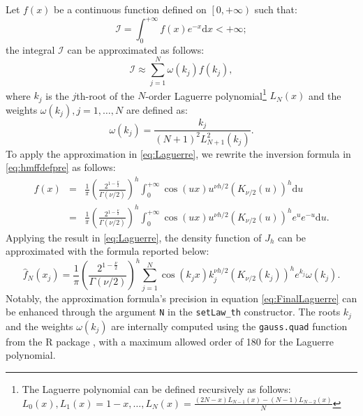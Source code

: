Let \(f\left(x\right)\) be a continuous function defined on \(\left[0, +\infty\right)\) such that:
\begin{equation*}
\mathcal{I}=\int_0^{+\infty} f\left(x\right) e^{-x}\mbox{d}x<+\infty;
\end{equation*}
the integral \(\mathcal{I}\) can be approximated as follows:
\begin{equation}
\mathcal{I}\approx \sum_{j=1}^{N}\omega\left(k_j\right)f\left(k_{j}\right),
\label{eq:Laguerre}
\end{equation}
where \(k_j\) is the \(j\)th-root of the \(N\)-order Laguerre polynomial\footnote{The Laguerre polynomial can be defined recursively as follows: \(L_0\left(x\right), L_1(x)=1-x, \ldots, L_{N}\left(x\right)=\frac{\left(2N-x\right)L_{N-1}\left(x\right)-\left(N-1\right)L_{N-2}\left(x\right)}{N}\)} \(L_N\left(x\right)\) and the weights \(\omega\left(k_j\right), j=1,\ldots, N\) are defined as:
\begin{equation}
\omega\left(k_{j}\right) = \frac{k_{j}}{\left(N+1\right)^2 L_{N+1}^2\left(k_j\right)}.
\end{equation}
To apply the approximation in \eqref{eq:Laguerre}, we rewrite the inversion formula in \eqref{eq:hmffdefpre} as follows:
\begin{eqnarray}
f\left(x\right)&=&\frac{1}{\pi}\left(\frac{2^{1-\frac{\nu}{2}}}{\Gamma\left(\nu/2\right)}\right)^h\int_{0}^{+\infty}\cos\left(ux\right)u^{\nu h/2}\left(K_{\nu/2}\left(u\right)\right)^h\mbox{d}u\nonumber\\
&=&\frac{1}{\pi}\left(\frac{2^{1-\frac{\nu}{2}}}{\Gamma\left(\nu/2\right)}\right)^h\int_{0}^{+\infty}\cos\left(ux\right)u^{\nu h/2}\left(K_{\nu/2}\left(u\right)\right)^he^{u}e^{-u}\mbox{d}u.
\label{eq:InvForLM}
\end{eqnarray}
Applying the result in \eqref{eq:Laguerre}, the density function of \(J_h\) can be approximated with the formula reported below:
\begin{equation}
\hat{f}_{N}\left(x_j\right) = \frac{1}{\pi}\left(\frac{2^{1-\frac{\nu}{2}}}{\Gamma\left(\nu/2\right)}\right)^h \sum_{j=1}^{N}\cos\left(k_j x\right)k_j^{\nu h/2}\left(K_{\nu/2}\left(k_j\right)\right)^he^{k_j}\omega\left(k_j\right).
\label{eq:FinalLaguerre}
\end{equation}
Notably, the approximation formula's precision in equation \eqref{eq:FinalLaguerre} can be enhanced through the argument \texttt{N} in the \texttt{setLaw\_th} constructor. The roots \(k_j\) and the weights \(\omega\left(k_j\right)\) are internally computed using the \texttt{gauss.quad} function from the R package  \citep{statmod, Goknur2016}, with a maximum allowed order of 180 for the Laguerre polynomial.

